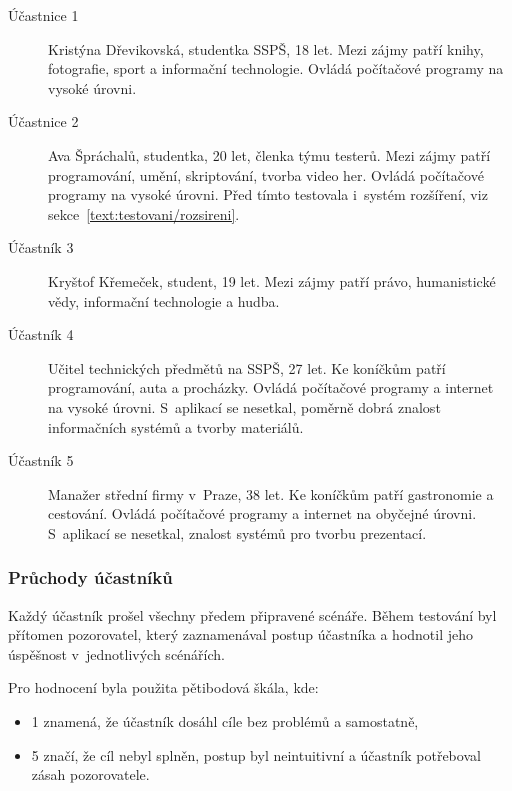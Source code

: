\begin{description}
\item[Účastnice 1] Kristýna Dřevikovská, studentka SSPŠ, 18 let. Mezi zájmy patří knihy, fotografie, sport a informační technologie. Ovládá počítačové programy na vysoké úrovni.
\item[Účastnice 2] Ava Špráchalů, studentka, 20 let, členka týmu testerů. Mezi zájmy patří programování, umění, skriptování, tvorba video her. Ovládá počítačové programy na vysoké úrovni. Před tímto testovala i~systém rozšíření, viz sekce~\ref{text:testovani/rozsireni}.
\item[Účastník 3] Kryštof Křemeček, student, 19 let. Mezi zájmy patří právo, humanistické vědy, informační technologie a hudba.
\item[Účastník 4] Učitel technických předmětů na SSPŠ, 27 let. Ke koníčkům patří programování, auta a procházky. Ovládá počítačové programy a internet na vysoké úrovni. S~aplikací se nesetkal, poměrně dobrá znalost informačních systémů a tvorby materiálů.
\item[Účastník 5] Manažer střední firmy v~Praze, 38 let. Ke koníčkům patří gastronomie a cestování. Ovládá počítačové programy a internet na obyčejné úrovni. S~aplikací se nesetkal, znalost systémů pro tvorbu prezentací.
\end{description}

\subsubsection{Průchody účastníků}

Každý účastník prošel všechny předem připravené scénáře.
Během testování byl přítomen pozorovatel, který zaznamenával postup účastníka a hodnotil jeho úspěšnost v~jednotlivých scénářích. 

Pro hodnocení byla použita pětibodová škála, kde:

\begin{itemize}
      \item 1 znamená, že účastník dosáhl cíle bez problémů a samostatně,
      \item 5 značí, že cíl nebyl splněn, postup byl neintuitivní a účastník potřeboval zásah pozorovatele.
\end{itemize}

